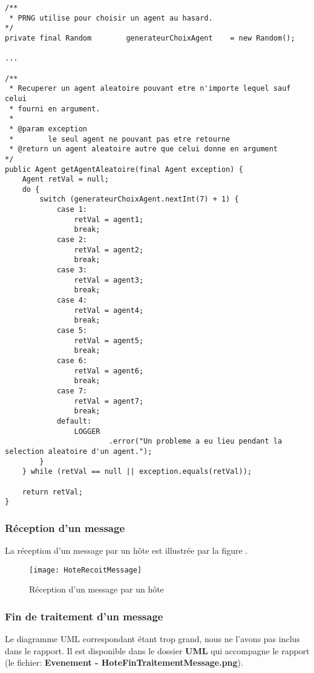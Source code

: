 \documentclass[a4paper,11pt]{article}
\begin{document}
\begin{lstlisting}[caption=Utilisation des variables aléatoires pour sélectionner un agent]
/**
 * PRNG utilise pour choisir un agent au hasard.
*/
private final Random		generateurChoixAgent	= new Random();
	
...

/**
 * Recuperer un agent aleatoire pouvant etre n'importe lequel sauf celui
 * fourni en argument.
 * 
 * @param exception
 *        le seul agent ne pouvant pas etre retourne
 * @return un agent aleatoire autre que celui donne en argument
*/
public Agent getAgentAleatoire(final Agent exception) {
	Agent retVal = null;
	do {
		switch (generateurChoixAgent.nextInt(7) + 1) {
			case 1:
				retVal = agent1;
				break;
			case 2:
				retVal = agent2;
				break;
			case 3:
				retVal = agent3;
				break;
			case 4:
				retVal = agent4;
				break;
			case 5:
				retVal = agent5;
				break;
			case 6:
				retVal = agent6;
				break;
			case 7:
				retVal = agent7;
				break;
			default:
				LOGGER
						.error("Un probleme a eu lieu pendant la selection aleatoire d'un agent.");
		}
	} while (retVal == null || exception.equals(retVal));
	
	return retVal;
}
\end{lstlisting}

\clearpage











\subsubsection{Réception d'un message}
La réception d'un message par un hôte est illustrée par la figure .

\begin{figure}[h!t]
  \centering
    \texttt{[image: HoteRecoitMessage]}
  \caption{Réception d'un message par un hôte}
  \label{fig:hote-recoit-message}
\end{figure}








\subsubsection{Fin de traitement d'un message}
Le diagramme UML correspondant étant trop grand, nous ne l'avons pas inclus dans le rapport. Il est disponible dans le dossier \textbf{UML} qui accompagne le rapport (le fichier: \textbf{Evenement - HoteFinTraitementMessage.png}).
\end{document}
